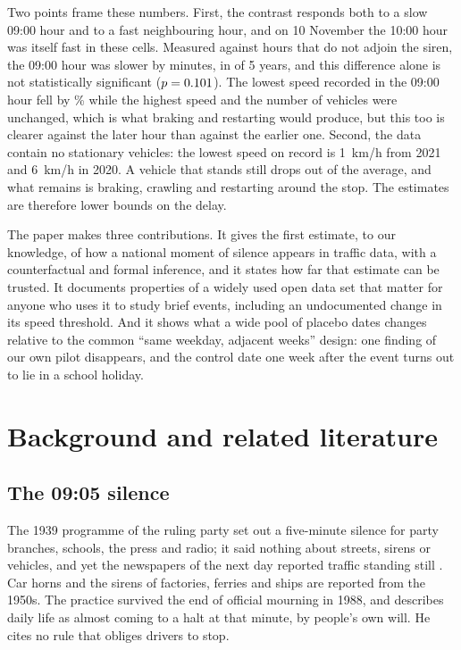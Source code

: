 \documentclass[11pt,a4paper]{article}
\begin{document}
Two points frame these numbers. First, the contrast responds both to a slow 09:00 hour and to a fast neighbouring hour, and on
10 November the 10:00 hour was itself fast in these cells. Measured against hours that do not adjoin the siren,
the 09:00 hour was slower by \minRobFar{} minutes, in \negRobFar{} of 5 years, and this difference
alone is not statistically significant ($p = 0.101$). The lowest speed recorded in the 09:00 hour
fell by \minspFastPct\% while the highest speed and the number of vehicles were unchanged, which is
what braking and restarting would produce, but this too is clearer against the later hour than
against the earlier one. Second, the data contain no stationary vehicles: the lowest speed on record
is 1~km/h from 2021 and 6~km/h in 2020. A vehicle that stands still drops out of the average, and
what remains is braking, crawling and restarting around the stop. The estimates are therefore lower
bounds on the delay.

The paper makes three contributions. It gives the first estimate, to our knowledge, of how a national
moment of silence appears in traffic data, with a counterfactual and formal inference, and it
states how far that estimate can be trusted. It documents
properties of a widely used open data set that matter for anyone who uses it to study brief events,
including an undocumented change in its speed threshold. And it shows what a wide pool of placebo dates changes relative to the common
``same weekday, adjacent weeks'' design: one finding of our own pilot disappears, and the control
date one week after the event turns out to lie in a school holiday.

\section{Background and related literature}

\subsection{The 09:05 silence}

The 1939 programme of the ruling party set out a five-minute silence for party branches, schools, the
press and radio; it said nothing about streets, sirens or vehicles, and yet the newspapers of the next
day reported traffic standing still \citep{uzun2019}. Car horns and the sirens of factories, ferries
and ships are reported from the 1950s. The practice survived the end of official mourning in 1988, and
\citet{uzun2019} describes daily life as almost coming to a halt at that minute, by people's own
will. He cites no rule that obliges drivers to stop.
\end{document}
